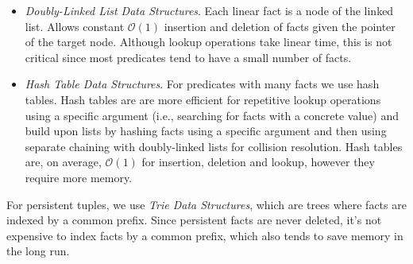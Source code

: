 \begin{itemize}

\item \emph{Doubly-Linked List Data Structures}. Each linear fact is a node of
   the linked list. Allows constant $\mathcal{O}(1)$ insertion and deletion of
   facts given the pointer of the target node. Although lookup operations take
   linear time, this is not critical since most predicates tend to have a small
   number of facts.

\item \emph{Hash Table Data Structures}. For predicates with many facts we use
   hash tables. Hash tables are are more efficient for repetitive lookup
   operations using a specific argument (i.e., searching for facts with a
   concrete value) and build upon lists by hashing facts using a
   specific argument and then using separate chaining with doubly-linked lists
   for collision resolution. Hash tables are, on average, $\mathcal{O}(1)$ for
   insertion, deletion and lookup, however they require more memory.

\end{itemize}

For persistent tuples, we use \emph{Trie Data Structures}, which are trees where
facts are indexed by a common prefix. Since persistent facts are never deleted,
it's not expensive to index facts by a common prefix, which also tends to save
memory in the long run.
